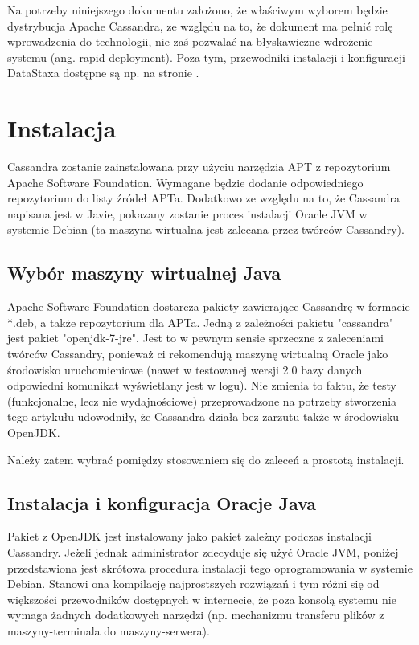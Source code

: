 \documentclass{article}
\begin{document}
Na potrzeby niniejszego dokumentu założono, że właściwym wyborem będzie dystrybucja Apache Cassandra, ze względu na to, że dokument ma pełnić rolę wprowadzenia do technologii, nie zaś pozwalać na błyskawiczne wdrożenie systemu (ang. rapid deployment). Poza tym, przewodniki instalacji i konfiguracji DataStaxa dostępne są np. na stronie \cite{datastax_guides}.

\section{Instalacja}

Cassandra zostanie zainstalowana przy użyciu narzędzia APT z repozytorium Apache Software Foundation. Wymagane będzie dodanie odpowiedniego repozytorium do listy źródeł APTa. Dodatkowo ze względu na to, że Cassandra napisana jest w Javie, pokazany zostanie proces instalacji Oracle JVM w systemie Debian (ta maszyna wirtualna jest zalecana przez twórców Cassandry).

\subsection{Wybór maszyny wirtualnej Java}

Apache Software Foundation dostarcza pakiety zawierające Cassandrę w formacie *.deb, a także repozytorium dla APTa. Jedną z zależności pakietu "cassandra" jest pakiet "openjdk-7-jre". Jest to w pewnym sensie sprzeczne z zaleceniami twórców Cassandry, ponieważ ci rekomendują maszynę wirtualną Oracle jako środowisko uruchomieniowe (nawet w testowanej wersji 2.0 bazy danych odpowiedni komunikat wyświetlany jest w logu). Nie zmienia to faktu, że testy (funkcjonalne, lecz nie wydajnościowe) przeprowadzone na potrzeby stworzenia tego artykułu udowodniły, że Cassandra działa bez zarzutu także w środowisku OpenJDK. 

Należy zatem wybrać pomiędzy stosowaniem się do zaleceń a prostotą instalacji.

\subsection{Instalacja i konfiguracja Oracje Java}

Pakiet z OpenJDK jest instalowany jako pakiet zależny podczas instalacji Cassandry. Jeżeli jednak administrator zdecyduje się użyć Oracle JVM, poniżej przedstawiona jest skrótowa procedura instalacji tego oprogramowania w systemie Debian. Stanowi ona kompilację najprostszych rozwiązań i tym różni się od większości przewodników dostępnych w internecie, że poza konsolą systemu nie wymaga żadnych dodatkowych narzędzi (np. mechanizmu transferu plików z maszyny-terminala do maszyny-serwera).
\end{document}
